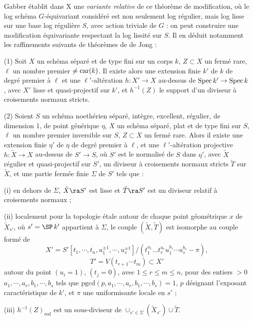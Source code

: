 \documentclass[10pt]{../fichiers-configuration-latex/smfart}
\begin{document}
Gabber établit dans X une \textit{variante relative} de ce théorème de modification, où le log
schéma $G$-équivariant considéré est non seulement log régulier, mais log lisse sur une base log
régulière $S$, avec action triviale de $G$ : on peut construire une modification équivariante
respectant la log lissité sur $S$. Il en déduit notamment les raffinements suivants de théorèmes de
de Jong :
\begin{theoreme}\label{0-deJong l'} (1) Soit $X$ un schéma séparé et de type fini sur un
corps $k$, $Z \subset X$ un fermé rare, $\ell$ un nombre premier $\ne \mathop{\rm car}(k)$. Il
existe alors une extension finie $k'$ de $k$ de degré premier à $\ell$ et une $\ell'$-altération $h
: X' \rightarrow X$ au-dessus de $\mathop{\rm Spec}k' \rightarrow \mathop{\rm Spec}k$, avec $X'$
lisse et quasi-projectif sur $k'$, et $h^{-1}(Z)$ le support d'un diviseur à croisements normaux
stricts.

(2) Soient $S$ un schéma noethérien séparé, intègre, excellent, régulier,  de dimension 1, de point
générique $\eta$, $X$ un schéma séparé, plat et de type fini sur  $S$, $\ell$ un nombre premier
inversible sur $S$, $Z \subset X$ un fermé rare. Alors il existe une extension finie $\eta'$ de
$\eta$ de degré premier à $\ell$, et une $\ell'$-altération projective $h : \tilde X \rightarrow X$
au-dessus de  $S'\rightarrow S$, où $S'$ est le normalisé de $S$ dans $\eta'$, avec $\tilde X$
régulier et quasi-projectif sur $S'$, un diviseur à croisements normaux stricts $\tilde T$ sur
$\tilde X$,  et une partie fermée finie $\Sigma$ de $S'$ tels que :

(i) en dehors de $\Sigma$, $\tilde X \ra S'$ est lisse et $\tilde T \ra S'$ est un diviseur relatif
à croisements normaux ;

(ii) localement pour la topologie étale autour de chaque point géométrique $x$ de $\tilde X_{s'}$,
où $s' = \SP \,k'$ appartient à $\Sigma$, le couple $(\tilde X, \tilde T)$ est isomorphe au couple
formé de $$ X'=S'[t_1,\cdots,t_n,u_1^{\pm 1}, \cdots, u_s^{\pm
1}]/(t_1^{a_1}...t_r^{a_r}u_1^{b_1}\cdots u_s^{b_s}-\pi), $$ $$ T' = V(t_{r+1} \cdots t_m) \subset
X' $$ autour du point $(u_i = 1)$, $(t_j = 0)$, avec $1 \le r \le m \le n$, pour des entiers $> 0$
$a_1, \cdots, a_r, b_1, \cdots, b_s$ tels que $\mathrm{pgcd}(p,a_1,\cdots,a_r,b_1,\cdots, b_s) = 1$,
$p$ désignant l'exposant caractéristique de $k'$, et $\pi$ une uniformisante locale en $s'$ ;

(iii) $h^{-1}(Z)_{\mathrm{red}}$ est un sous-diviseur de $\cup_{s' \in \Sigma} (\tilde X_{s'}) \cup
\tilde T$.  \end{theoreme}
\end{document}
